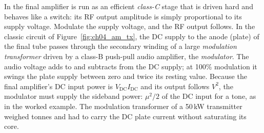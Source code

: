 In  the final amplifier is run as an efficient \emph{class-C} stage that is
driven hard and behaves like a switch: its RF output amplitude is simply proportional to its supply
voltage. Modulate the supply voltage, and the RF output follows. In the classic 
circuit of Figure~\ref{fig:ch04_am_tx}, the DC supply to the anode (plate) of the final tube passes
through the secondary winding of a large \emph{modulation transformer} driven by a class-B push-pull
audio amplifier, the \emph{modulator}. The audio voltage adds to and subtracts from the DC supply; at
100\% modulation it swings the plate supply between zero and twice its resting value. Because the final
amplifier's DC input power is $V_{\text{DC}}I_{\text{DC}}$ and its output follows $V^2$, the modulator
must supply the sideband power: $\mu^2/2$ of the DC input for a tone, as in the worked example. The
modulation transformer of a 50\,kW transmitter weighed tonnes and had to carry the DC plate current
without saturating its core.

